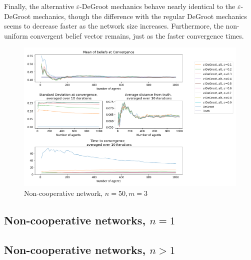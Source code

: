 \documentclass{article}
\begin{document}
\newpage

Finally, the alternative $\varepsilon$-DeGroot mechanics behave nearly identical to the $\varepsilon$-DeGroot mechanics, though the difference with the regular DeGroot mechanics seems to decrease faster as the network size increases. Furthermore, the non-uniform convergent belief vector remains, just as the faster convergence times.

\begin{center}
    \begin{figure}[!htbp]
        \centering
        \includegraphics[width=1.2\textwidth]{ThesisKI/Images/WisdomAltEDeGroot.png}
        \caption{Non-cooperative network, $n=50, m=3$}
        \label{network:noncoop}
    \end{figure}
\end{center}




\subsection{Non-cooperative networks, $n=1$}

\subsection{Non-cooperative networks, $n > 1$}
\end{document}
